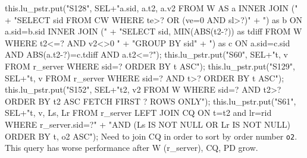this.lu_pstr.put("S128", SEL+"a.sid, a.t2, a.v2 FROM W AS a INNER JOIN ("
      + "SELECT sid FROM CW WHERE te>? OR (ve=0 AND sl>?)"
      + ") as b ON a.sid=b.sid INNER JOIN ("
      + "SELECT sid, MIN(ABS(t2-?)) as tdiff FROM W WHERE t2<=? AND v2<>0 "
      + "GROUP BY sid"
      + ") as c ON a.sid=c.sid AND ABS(a.t2-?)=c.tdiff AND a.t2<=?");
\eatline
{}\nwendcode{}\endmoddef{}
this.lu_pstr.put("S60", SEL+"t, v FROM r_server WHERE sid=? ORDER BY t ASC");
\eatline
{}\nwendcode{}\endmoddef{}
this.lu_pstr.put("S129", SEL+"t, v FROM r_server WHERE sid=? AND t>? ORDER BY t ASC");
\eatline
{}\nwendcode{}\endmoddef{}
this.lu_pstr.put("S152", SEL+"t2, v2 FROM W WHERE sid=? AND t2>? ORDER BY t2 ASC FETCH FIRST ? ROWS ONLY");
\eatline
{}\nwendcode{}\endmoddef{}
this.lu_pstr.put("S61", SEL+"t, v, Ls, Lr FROM r_server LEFT JOIN CQ ON t=t2 and lr=rid WHERE r_server.sid=?"
      + "AND (Ls IS NOT NULL OR Lr IS NOT NULL) ORDER BY t, o2 ASC");
\eatline
{}\nwendcode{}Need to join CQ in order to sort by order number {\tt{}o2}. This query has
worse performance after W (r\_server), CQ, PD grow.
\nwenddocs{}\endmoddef{}
